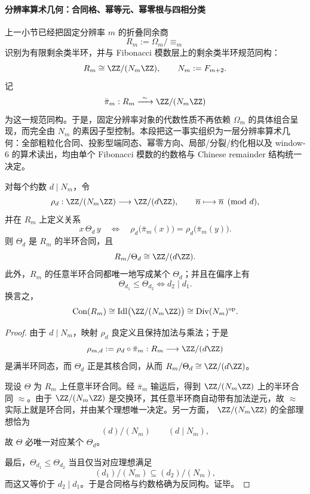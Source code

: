 \paragraph{分辨率算术几何：合同格、幂等元、幂零根与四相分类}
上一小节已经把固定分辨率 \(m\) 的折叠同余商
\[
R_m:=\Omega_m/\!\equiv_m
\]
识别为有限剩余类半环，并与 Fibonacci 模数层上的剩余类半环规范同构：
\[
R_m\cong \ZZ/(N_m\ZZ),
\qquad
N_m:=F_{m+2}.
\]
记
\[
\bar\pi_m:R_m\xrightarrow{\ \sim\ }\ZZ/(N_m\ZZ)
\]
为这一规范同构。于是，固定分辨率对象的代数性质不再依赖 \(\Omega_m\) 的具体组合呈现，而完全由 \(N_m\) 的素因子型控制。本段把这一事实组织为一层分辨率算术几何：全部粗粒化合同、投影型端同态、幂零方向、局部/分裂/约化相以及 window-\(6\) 的算术读出，均由单个 Fibonacci 模数的约数格与 Chinese remainder 结构统一决定。

\begin{theorem}\label{thm:xi-fold-congruence-quotient-divisor-lattice}
对每个约数 \(d\mid N_m\)，令
\[
\rho_d:\ZZ/(N_m\ZZ)\longrightarrow \ZZ/(d\ZZ),
\qquad
\overline n\longmapsto \overline n \pmod d,
\]
并在 \(R_m\) 上定义关系
\[
x\,\Theta_d\,y
\quad\Longleftrightarrow\quad
\rho_d\!\bigl(\bar\pi_m(x)\bigr)=\rho_d\!\bigl(\bar\pi_m(y)\bigr).
\]
则 \(\Theta_d\) 是 \(R_m\) 的半环合同，且
\[
R_m/\Theta_d\cong \ZZ/(d\ZZ).
\]
此外，\(R_m\) 的任意半环合同都唯一地写成某个 \(\Theta_d\)；并且在偏序上有
\[
\Theta_{d_1}\le \Theta_{d_2}
\iff
d_2\mid d_1.
\]
换言之，
\[
\operatorname{Con}(R_m)
\cong
\operatorname{Idl}\bigl(\ZZ/(N_m\ZZ)\bigr)
\cong
\operatorname{Div}(N_m)^{\mathrm{op}}.
\]
\end{theorem}
\begin{proof}
由于 \(d\mid N_m\)，映射 \(\rho_d\) 良定义且保持加法与乘法；于是
\[
\rho_{m,d}:=\rho_d\circ \bar\pi_m:R_m\longrightarrow \ZZ/(d\ZZ)
\]
是满半环同态，而 \(\Theta_d\) 正是其核合同，从而 \(R_m/\Theta_d\cong \ZZ/(d\ZZ)\)。

现设 \(\Theta\) 为 \(R_m\) 上任意半环合同。经 \(\bar\pi_m\) 输运后，得到 \(\ZZ/(N_m\ZZ)\) 上的半环合同 \(\approx\)。由于 \(\ZZ/(N_m\ZZ)\) 是交换环，其任意半环商自动带有加法逆元，故 \(\approx\) 实际上就是环合同，并由某个理想唯一决定。另一方面，
\(\ZZ/(N_m\ZZ)\) 的全部理想恰为
\[
(d)/(N_m)
\qquad
(d\mid N_m),
\]
故 \(\Theta\) 必唯一对应某个 \(\Theta_d\)。

最后，\(\Theta_{d_1}\le \Theta_{d_2}\) 当且仅当对应理想满足
\[
(d_1)/(N_m)\subseteq (d_2)/(N_m),
\]
而这又等价于 \(d_2\mid d_1\)。于是合同格与约数格确为反同构。证毕。
\end{proof}

